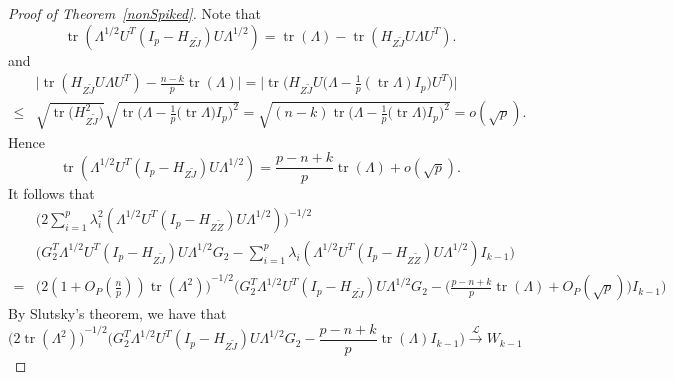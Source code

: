 \documentclass[review]{elsarticle}
\DeclareMathOperator{\mytr}{tr}
\theoremstyle{plain}
\theoremstyle{definition}
\theoremstyle{remark}
\begin{document}
\begin{proof}[\textrm{Proof of Theorem~\ref{nonSpiked}}]
Note that
    $$
    \mytr(\Lambda^{1/2}U^T (I_p-H_{Z\tilde{J}})U\Lambda^{1/2})
    =
    \mytr(\Lambda)-\mytr(H_{Z\tilde{J}}U\Lambda U^T).
    $$ 
and
    $$
    \begin{aligned}
        &
        \big|
    \mytr(H_{Z\tilde{J}}U\Lambda U^T)
    -\frac{n-k}{p}\mytr(\Lambda)
    \big|
    =
    \big|
    \mytr\Big(H_{Z\tilde{J}} U \big(\Lambda-\frac{1}{p} (\mytr \Lambda) I_p \big) U^T\Big)
    \big|
        \\
        \leq &
        \sqrt{\mytr \big(H_{Z\tilde{J}}^2\big)}
        \sqrt{\mytr \Big(\Lambda-\frac{1}{p}\big(\mytr \Lambda\big) I_p\Big)^2}
        =\sqrt{(n-k)\mytr \Big(\Lambda-\frac{1}{p}\big(\mytr \Lambda\big) I_p\Big)^2}
        =o(\sqrt{p}).
    \end{aligned}
    $$
    Hence 
    $$
    \mytr(\Lambda^{1/2}U^T (I_p-H_{Z\tilde{J}})U\Lambda^{1/2})
    =
    \frac{p-n+k}{p}\mytr(\Lambda)+o(\sqrt{p}).
    $$
    It follows that
    $$
    \begin{aligned}
        &\Big(2\sum_{i=1}^p \lambda_i^2(\Lambda^{1/2}U^T(I_p-H_{Z\tilde{Z}})U\Lambda^{1/2})\Big)^{-1/2}\\
        &{\Big( G_2^T \Lambda^{1/2}U^T (I_p-H_{Z\tilde{J}})U\Lambda^{1/2}G_2-\sum_{i=1}^p \lambda_i(\Lambda^{1/2}U^T(I_p-H_{Z\tilde{Z}})U\Lambda^{1/2})I_{k-1}\Big)}\\
        =&
        {\Big( 2(1+O_P(\frac{n}{p}))\mytr (\Lambda^2)\Big) }^{-1/2} {\Big( G_2^T \Lambda^{1/2}U^T (I_p-H_{Z\tilde{J}})U\Lambda^{1/2}G_2-
        \big(\frac{p-n+k}{p}\mytr(\Lambda)+O_P(\sqrt{p})\big)I_{k-1}
        \Big)}
    \end{aligned}
    $$
    By Slutsky's theorem, we have that
    $$
    {\Big(2\mytr (\Lambda^2)\Big)}^{-1/2}{\Big( G_2^T \Lambda^{1/2}U^T (I_p-H_{Z\tilde{J}})U\Lambda^{1/2}G_2-
        \frac{p-n+k}{p}\mytr(\Lambda)I_{k-1}\Big)}
    \xrightarrow{\mathcal{L}}W_{k-1}
    $$


\end{proof}
\end{document}
